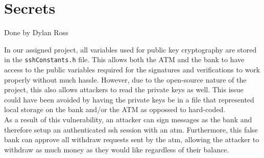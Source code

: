 \section{Secrets}\label{sec:secrets}
Done by Dylan Ross

	\medskip
	In our assigned project, all variables used for public key cryptography are stored in the \texttt{sshConstants.h} file. This allows both the ATM and the bank to have access to the public
	variables required for the signatures and verifications to work properly without much hassle. However, due to the open-source nature of the project, this also allows attackers to read the
	private keys as well. This issue could have been avoided by having the private keys be in a file that represented local storage on the bank and/or the ATM as oppossed to hard-coded.\\

	As a result of this vulnerability, an attacker can sign messages as the bank and therefore setup an authenticated ssh session with an atm. Furthermore, this false bank can approve all
	withdraw requests sent by the atm, allowing the attacker to withdraw as much money as they would like regardless of their balance.
